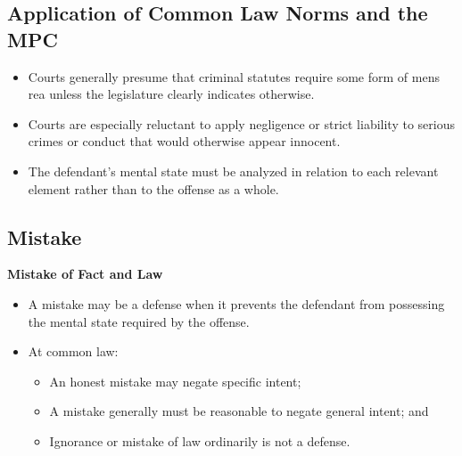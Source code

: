 \documentclass[11pt]{tex/lawoutline}
\begin{document}

\subsection{Application of Common Law Norms and the MPC}{
\begin{itemize}
    \item Courts generally presume that criminal statutes require some form of mens rea unless the legislature clearly indicates otherwise.
    \item Courts are especially reluctant to apply negligence or strict liability to serious crimes or conduct that would otherwise appear innocent.
    \item The defendant's mental state must be analyzed in relation to each relevant element rather than to the offense as a whole.
\end{itemize}
}


\subsection{Mistake}

\textbf{Mistake of Fact and Law}
\begin{itemize}
    \item A mistake may be a defense when it prevents the defendant from possessing the mental state required by the offense.
    \item At common law:
    \begin{itemize}
        \item An honest mistake may negate specific intent;
        \item A mistake generally must be reasonable to negate general intent; and
        \item Ignorance or mistake of law ordinarily is not a defense.
    \end{itemize}
\end{itemize}
\end{document}
